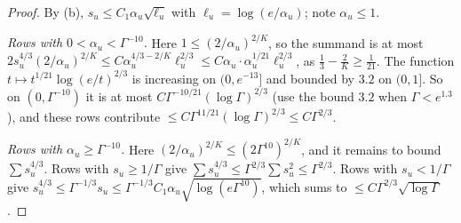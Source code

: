\documentclass[11pt]{amsart}
\theoremstyle{definition}
\begin{document}
\begin{proof}
By (b), $s_u\le C_1\alpha_u\sqrt{\ell_u}$ with $\ell_u=\log(e/\alpha_u)$; note $\alpha_u\le1$.

\emph{Rows with $0<\alpha_u<\Gamma^{-10}$.} Here $1\le(2/\alpha_u)^{2/K}$, so the summand is at most $2s_u^{4/3}(2/\alpha_u)^{2/K}\le C\alpha_u^{4/3-2/K}\ell_u^{2/3}\le C\alpha_u\cdot\alpha_u^{1/21}\ell_u^{2/3}$, as $\frac13-\frac2K\ge\frac1{21}$. The function $t\mapsto t^{1/21}\log(e/t)^{2/3}$ is increasing on $(0,e^{-13}]$ and bounded by $3.2$ on $(0,1]$. So on $(0,\Gamma^{-10})$ it is at most $C\Gamma^{-10/21}(\log \Gamma)^{2/3}$ (use the bound $3.2$ when $\Gamma<e^{1.3}$), and these rows contribute $\le C\Gamma^{11/21}(\log \Gamma)^{2/3}\le C\Gamma^{2/3}$.

\emph{Rows with $\alpha_u\ge \Gamma^{-10}$.} Here $(2/\alpha_u)^{2/K}\le(2\Gamma^{10})^{2/K}$, and it remains to bound $\sum s_u^{4/3}$. Rows with $s_u\ge1/\Gamma$ give $\sum s_u^{4/3}\le \Gamma^{2/3}\sum s_u^2\le \Gamma^{2/3}$. Rows with $s_u<1/\Gamma$ give $s_u^{4/3}\le \Gamma^{-1/3}s_u\le \Gamma^{-1/3}C_1\alpha_u\sqrt{\log(e\Gamma^{10})}$, which sums to $\le C\Gamma^{2/3}\sqrt{\log \Gamma}$.
\end{proof}
\end{document}
